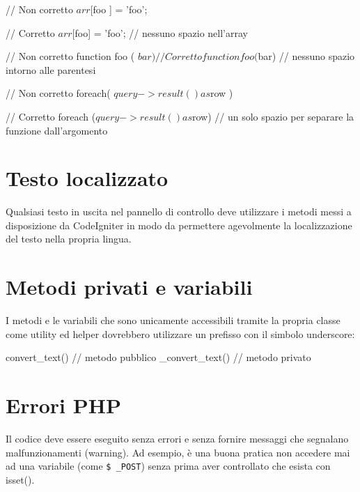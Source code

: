 \begin{code}
// Non corretto
$arr[ $foo ] = 'foo';

// Corretto
$arr[$foo] = 'foo'; // nessuno spazio nell'array


// Non corretto
function foo ( $bar )
{

}

// Corretto
function foo($bar) // nessuno spazio intorno alle parentesi
{

}


// Non corretto
foreach( $query->result() as $row )

// Corretto
foreach ($query->result() as $row) // un solo spazio per separare la funzione dall'argomento
\end{code}

\section*{Testo localizzato}
Qualsiasi testo in uscita nel pannello di controllo deve utilizzare i metodi messi a disposizione da CodeIgniter in modo da permettere agevolmente la localizzazione del testo nella propria lingua.


\section*{Metodi privati e variabili}
I metodi e le variabili che sono unicamente accessibili tramite la propria classe come utility ed helper dovrebbero utilizzare un prefisso con il simbolo underscore:

\begin{code}
convert_text() // metodo pubblico
_convert_text()	// metodo privato
\end{code}

\section*{Errori PHP}
Il codice deve essere eseguito senza errori e senza fornire messaggi che segnalano malfunzionamenti (warning). Ad esempio, è una buona pratica non accedere mai ad una variabile (come \verb|$ _POST|) senza prima aver controllato che esista con isset().

